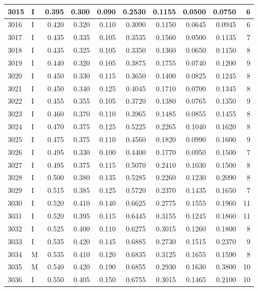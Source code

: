 \documentclass[9pt,twocolumn,twoside,]{pnas-new}
\begin{document}
\begin{tabular}{l|l|r|r|r|r|r|r|r|r}
\hline
3015 & I & 0.395 & 0.300 & 0.090 & 0.2530 & 0.1155 & 0.0500 & 0.0750 & 6\\
\hline
3016 & I & 0.420 & 0.320 & 0.110 & 0.3090 & 0.1150 & 0.0645 & 0.0945 & 6\\
\hline
3017 & I & 0.435 & 0.335 & 0.105 & 0.3535 & 0.1560 & 0.0500 & 0.1135 & 7\\
\hline
3018 & I & 0.435 & 0.325 & 0.105 & 0.3350 & 0.1360 & 0.0650 & 0.1150 & 8\\
\hline
3019 & I & 0.440 & 0.320 & 0.105 & 0.3875 & 0.1755 & 0.0740 & 0.1200 & 9\\
\hline
3020 & I & 0.450 & 0.330 & 0.115 & 0.3650 & 0.1400 & 0.0825 & 0.1245 & 8\\
\hline
3021 & I & 0.450 & 0.340 & 0.125 & 0.4045 & 0.1710 & 0.0700 & 0.1345 & 8\\
\hline
3022 & I & 0.455 & 0.355 & 0.105 & 0.3720 & 0.1380 & 0.0765 & 0.1350 & 9\\
\hline
3023 & I & 0.460 & 0.370 & 0.110 & 0.3965 & 0.1485 & 0.0855 & 0.1455 & 8\\
\hline
3024 & I & 0.470 & 0.375 & 0.125 & 0.5225 & 0.2265 & 0.1040 & 0.1620 & 8\\
\hline
3025 & I & 0.475 & 0.375 & 0.110 & 0.4560 & 0.1820 & 0.0990 & 0.1600 & 9\\
\hline
3026 & I & 0.495 & 0.330 & 0.100 & 0.4400 & 0.1770 & 0.0950 & 0.1500 & 7\\
\hline
3027 & I & 0.495 & 0.375 & 0.115 & 0.5070 & 0.2410 & 0.1030 & 0.1500 & 8\\
\hline
3028 & I & 0.500 & 0.380 & 0.135 & 0.5285 & 0.2260 & 0.1230 & 0.2090 & 8\\
\hline
3029 & I & 0.515 & 0.385 & 0.125 & 0.5720 & 0.2370 & 0.1435 & 0.1650 & 7\\
\hline
3030 & I & 0.520 & 0.410 & 0.140 & 0.6625 & 0.2775 & 0.1555 & 0.1960 & 11\\
\hline
3031 & I & 0.520 & 0.395 & 0.115 & 0.6445 & 0.3155 & 0.1245 & 0.1860 & 11\\
\hline
3032 & I & 0.525 & 0.400 & 0.110 & 0.6275 & 0.3015 & 0.1260 & 0.1800 & 8\\
\hline
3033 & I & 0.535 & 0.420 & 0.145 & 0.6885 & 0.2730 & 0.1515 & 0.2370 & 9\\
\hline
3034 & M & 0.535 & 0.410 & 0.120 & 0.6835 & 0.3125 & 0.1655 & 0.1590 & 8\\
\hline
3035 & M & 0.540 & 0.420 & 0.190 & 0.6855 & 0.2930 & 0.1630 & 0.3800 & 10\\
\hline
3036 & I & 0.550 & 0.405 & 0.150 & 0.6755 & 0.3015 & 0.1465 & 0.2100 & 10\\

\end{tabular}
\end{document}
